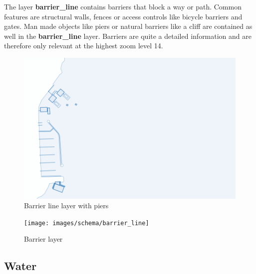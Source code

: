 \noindent\begin{minipage}[t]{0.48\linewidth}
    \vspace{0pt}
    The layer \textbf{barrier\_line} contains barriers that block a way or path. Common features are structural walls, fences or access controls like bicycle barriers and gates. Man made objects like piers or natural barriers like a cliff are contained as well in the \textbf{barrier\_line} layer. Barriers are quite a detailed information and are therefore only relevant at the highest zoom level 14.
\end{minipage}
\hfill
\begin{minipage}[t]{0.48\linewidth}
    \begin{figure}[H]
      \includegraphics[width=1\textwidth]{images/schema/piers_example}
      \caption{Barrier line layer with piers}
    \end{figure}
\end{minipage}

\begin{figure}[H]
  \centering
  \texttt{[image: images/schema/barrier\_line]}
  \caption{Barrier layer}
\end{figure}


\subsection{Water}


